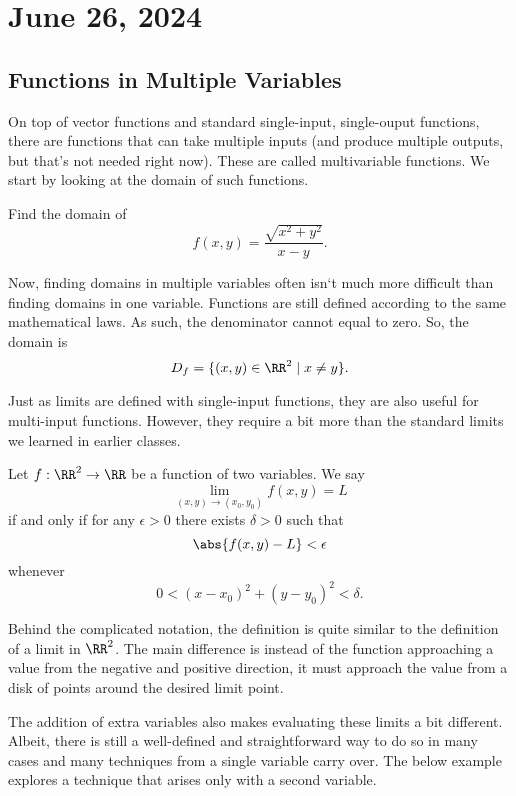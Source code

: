 \chapter{June 26, 2024}

\section{Functions in Multiple Variables}

On top of vector functions and standard single-input, single-ouput functions, there are functions that can take multiple inputs (and produce multiple outputs, but that's not needed right now). These are called multivariable functions. We start by looking at the domain of such functions.

\begin{example}
    Find the domain of
    \[f(x, y) = \frac{\sqrt{x^{2} + y^{2}}}{x - y}.\]

    \begin{soln}
        Now, finding domains in multiple variables often isn`t much more difficult than finding domains in one variable. Functions are still defined according to the same mathematical laws. As such, the denominator cannot equal to zero. So, the domain is
        \[D_{f} = \{(x, y) \in \RR^{2} \mid x \neq y\}.\]
    \end{soln}
\end{example}

Just as limits are defined with single-input functions, they are also useful for multi-input functions. However, they require a bit more than the standard limits we learned in earlier classes.

\begin{definition}
    Let $f : \RR^{2} \to \RR$ be a function of two variables. We say
    \[\lim_{(x, y) \to (x_{0}, y_{0})} f(x, y) = L\]
    if and only if for any $\epsilon > 0$ there exists $\delta > 0$ such that
    \[\abs{f(x, y) - L} < \epsilon\]
    whenever
    \[0 < (x - x_{0})^{2} + (y - y_{0})^{2} < \delta.\]
\end{definition}

Behind the complicated notation, the definition is quite similar to the definition of a limit in $\RR^{2}$. The main difference is instead of the function approaching a value from the negative and positive direction, it must approach the value from a disk of points around the desired limit point.

The addition of extra variables also makes evaluating these limits a bit different. Albeit, there is still a well-defined and straightforward way to do so in many cases and many techniques from a single variable carry over. The below example explores a technique that arises only with a second variable.

